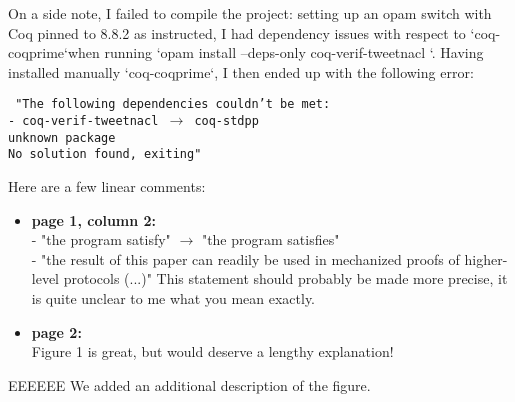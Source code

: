 On a side note, I failed to compile the project: setting up an opam switch with Coq pinned to 8.8.2 as instructed, I had dependency issues with respect to `coq-coqprime`when running `opam install --deps-only coq-verif-tweetnacl `. Having installed manually `coq-coqprime`, I then ended up with the following error:

{\footnotesize\texttt{
    "The following dependencies couldn't be met:\\
    - coq-verif-tweetnacl $\rightarrow$ coq-stdpp \\
    unknown package\\
    No solution found, exiting"}}

Here are a few linear comments:

\begin{itemize}
    \item \textbf{page 1, column 2:}\\
          - "the program satisfy" $\rightarrow$ "the program satisfies"\\
          - "the result of this paper can readily be used in mechanized proofs of higher-level protocols (...)"
          This statement should probably be made more precise, it is quite unclear to me what you mean exactly.

    \item \textbf{page 2:}\\
          Figure 1 is great, but would deserve a lengthy explanation!
\end{itemize}
\begin{answer}{EEEEEE}
    We added an additional description of the figure.
\end{answer}

